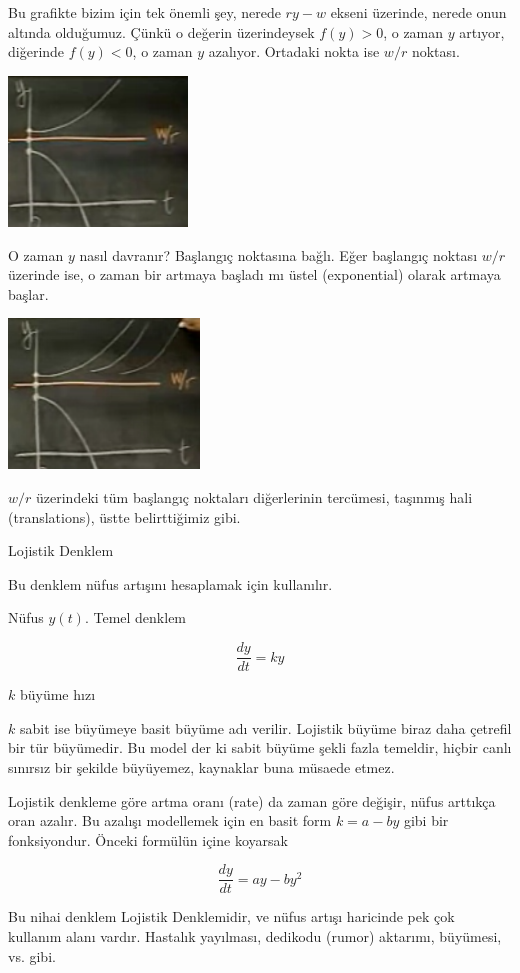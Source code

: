 \documentclass[12pt,fleqn]{article}\usepackage{../../common}
\begin{document}
Bu grafikte bizim için tek önemli şey, nerede $ry-w$ ekseni üzerinde,
nerede onun altında olduğumuz. Çünkü o değerin üzerindeysek $f(y) > 0$, o
zaman $y$ artıyor, diğerinde $f(y) < 0$, o zaman $y$ azalıyor. Ortadaki
nokta ise $w/r$ noktası.

\includegraphics[height=4cm]{5_5.png}

O zaman $y$ nasıl davranır? Başlangıç noktasına bağlı. Eğer başlangıç
noktası $w/r$ üzerinde ise, o zaman bir artmaya başladı mı üstel
(exponential) olarak artmaya başlar.

\includegraphics[height=4cm]{5_6.png}

$w/r$ üzerindeki tüm başlangıç noktaları diğerlerinin tercümesi, taşınmış
hali (translations), üstte belirttiğimiz gibi. 

Lojistik Denklem

Bu denklem nüfus artışını hesaplamak için kullanılır. 

Nüfus $y(t)$.  Temel denklem

$$ \frac{dy}{dt} = ky$$

$k$ büyüme hızı

$k$ sabit ise büyümeye basit büyüme adı verilir. Lojistik büyüme biraz daha
çetrefil bir tür büyümedir. Bu model der ki sabit büyüme şekli fazla
temeldir, hiçbir canlı sınırsız bir şekilde büyüyemez, kaynaklar buna
müsaede etmez. 

Lojistik denkleme göre artma oranı (rate) da zaman göre değişir, nüfus
arttıkça oran azalır. Bu azalışı modellemek için en basit form $k = a - by$
gibi bir fonksiyondur. Önceki formülün içine koyarsak

$$ \frac{dy}{dt} = ay - by^2 $$

Bu nihai denklem Lojistik Denklemidir, ve nüfus artışı haricinde pek çok
kullanım alanı vardır. Hastalık yayılması, dedikodu (rumor) aktarımı,
büyümesi, vs. gibi.
\end{document}
